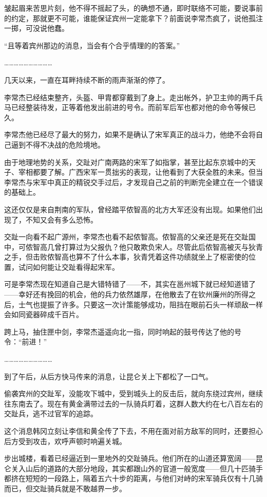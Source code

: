 皱起眉来苦思片刻，他不得不摇起了头，的确想不通，即时联络不可能，要说事前的约定，那就更不可能，谁能保证宾州一定能拿下？前面说李常杰疯了，说他孤注一掷，可没说他蠢。

“且等着宾州那边的消息，当会有个合乎情理的的答案。”

…………………………

几天以来，一直在耳畔持续不断的雨声渐渐的停了。

李常杰已经结束整齐，头盔、甲胄都穿戴到了身上。走出帐外，护卫主帅的两千兵马已经整装待发，正等着他发出前进的号令。而前军后军也都对他的命令等候已久。

李常杰他已经尽了最大的努力，如果不是确认了宋军真正的战斗力，他绝不会将自己逼到不得不决战的危险境地。

由于地理地势的关系，交趾对广南两路的宋军了如指掌，甚至比起东京城中的天子、宰相都要了解。广西宋军一贯拙劣的表现，让他看到了大获全胜的未来。但当李常杰与宋军中真正的精锐交手过后，才发现自己之前的判断完全建立在一个错误的基础上。

这还仅仅是来自荆南的军队，曾经踏平侬智高的北方大军还没有出现。如果他们出现了，不知又会有多么恐怖。

交趾一向看不起广源州，李常杰也看不起侬智高。侬智高的父亲还是死在交趾国中，可侬智高几曾打算过为父报仇？他只敢欺负宋人。尽管此后侬智高被灭与狄青之手，但击败侬智高也算不了什么本事，狄青凭着这件功绩就坐上了枢密使的位置，试问如何能让交趾看得起宋军。

可是李常杰现在知道自己是大错特错了——不，其实在邕州城下就已经知道错了——幸好还有挽回的机会，他的兵力依然雄厚，在他散去了在钦州廉州的所得之后，士气也提振了许多。只要这一次计策能够成功，阻挡在眼前石头一样顽敌一样会如同瓷器碎成千百片。

跨上马，抽住匣中剑，李常杰遥遥向北一指，同时响起的鼓号传达了他的号令：“前进！”

…………………………

到了午后，从后方快马传来的消息，让昆仑关上下都松了一口气。

偷袭宾州的交趾军，没能攻下城中，受到城头上的反击后，就向东绕过宾州，继续往东南去了。现在有黄金满带过去的一队骑兵盯着，这群人数大约在七八百左右的交趾兵，逃不过官军的追踪。

这个消息韩冈立刻让李信和黄全传了下去，不用在面对前方敌军的同时，还要担心后方受到攻击，欢呼声顿时响遍关城。

步出城楼，看着已经逼近到一里地外的交趾骑兵。他们所在的山道还算宽阔——昆仑关入山后的道路的大部分地段，其实都跟山外的官道一般宽度——但几十匹骑手都挤在短短的一段路上，隔着五六十步的距离，与他们对峙的宋军骑兵仅有十几骑而已，但交趾骑兵就是不敢越界一步。

